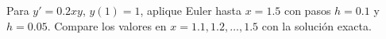 Para $y'=0.2xy$, $y(1)=1$, aplique Euler hasta $x=1.5$ con pasos $h=0.1$ y $h=0.05$. Compare los valores en $x=1.1,1.2,\ldots,1.5$ con la solución exacta.
